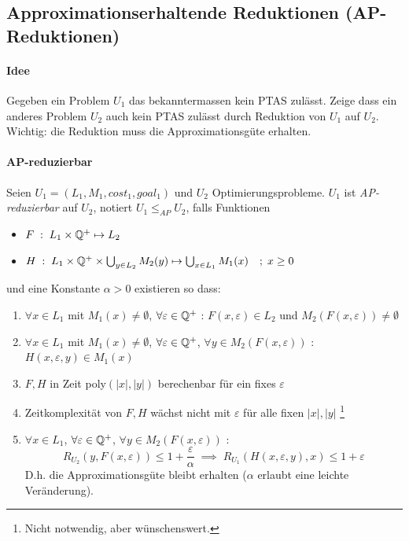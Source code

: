 \subsection{Approximationserhaltende Reduktionen (AP-Reduktionen)}

\paragraph{Idee}
Gegeben ein Problem $U_1$ das bekanntermassen kein PTAS zulässt.
Zeige dass ein anderes Problem $U_2$ auch kein PTAS zulässt durch Reduktion von $U_1$ auf $U_2$.
Wichtig: die Reduktion muss die Approximationsgüte erhalten.

\paragraph{AP-reduzierbar}
Seien $U_1 = (L_1, M_1, cost_1, goal_1)$ und $U_2$ Optimierungsprobleme.
$U_1$ ist \emph{AP-reduzierbar} auf $U_2$, notiert $U_1 \leq_{AP} U_2$, falls Funktionen
\begin{itemize}
    \item $ F \; : \; L_1 \times \mathbb{Q}^+ \mapsto L_2 $
    \item $ H \; : \; L_1 \times \mathbb{Q}^+ \times \bigcup_{y \in L_2} M_2(y) \mapsto \bigcup_{x \in L_1} M_1(x) \quad ; \; x \geq 0 $
\end{itemize}
und eine Konstante $\alpha > 0$ existieren so dass:
\begin{enumerate}[label=(\roman*)]
    \item $\forall x \in L_1$ mit $M_1(x) \neq \emptyset$, $\forall \varepsilon \in \mathbb{Q}^+$ : \quad
        $F(x, \varepsilon) \in L_2$ und $M_2(F(x, \varepsilon)) \neq \emptyset$
    \item $\forall x \in L_1$ mit $M_1(x) \neq \emptyset$, $\forall \varepsilon \in \mathbb{Q}^+$,
        $\forall y \in M_2(F(x, \varepsilon))$ : \quad
        $H(x, \varepsilon, y) \in M_1(x)$
    \item $F, H$ in Zeit poly$(|x|, |y|)$ berechenbar für ein fixes $\varepsilon$
    \item Zeitkomplexität von $F,H$ wächst nicht mit $\varepsilon$ für alle fixen $|x|, |y|$
        \footnote{Nicht notwendig, aber wünschenswert.}
    \item $\forall x \in L_1$, $\forall \varepsilon \in \mathbb{Q}^+$, $\forall y \in M_2(F(x, \varepsilon))$ : \quad
        $$ R_{U_2}(y, F(x,\varepsilon)) \leq 1 + \frac{\varepsilon}{\alpha}
        \; \implies \; R_{U_1}(H(x, \varepsilon, y), x) \leq 1 + \varepsilon $$
        D.h. die Approximationsgüte bleibt erhalten ($\alpha$ erlaubt eine leichte Veränderung).
\end{enumerate}

